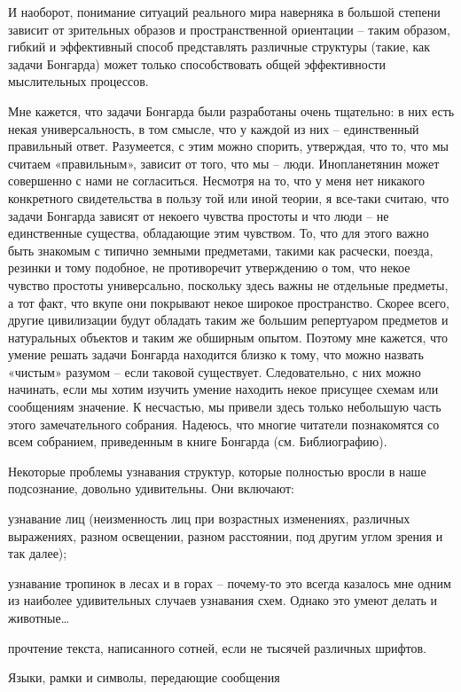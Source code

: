 \documentclass[../main.tex]{subfiles}
\begin{document}
И наоборот, понимание ситуаций реального мира наверняка в большой степени зависит от зрительных образов и пространственной ориентации \--- таким образом, гибкий и эффективный способ представлять различные структуры (такие, как задачи Бонгарда) может только способствовать общей эффективности мыслительных процессов.

Мне кажется, что задачи Бонгарда были разработаны очень тщательно: в них есть некая универсальность, в том смысле, что у каждой из них \--- единственный правильный ответ. Разумеется, с этим можно спорить, утверждая, что то, что мы считаем «правильным», зависит от того, что мы \--- люди. Инопланетянин может совершенно с нами не согласиться. Несмотря на то, что у меня нет никакого конкретного свидетельства в пользу той или иной теории, я все-таки считаю, что задачи Бонгарда зависят от некоего чувства простоты и что люди \--- не единственные существа, обладающие этим чувством. То, что для этого важно быть знакомым с типично земными предметами, такими как расчески, поезда, резинки и тому подобное, не противоречит утверждению о том, что некое чувство простоты универсально, поскольку здесь важны не отдельные предметы, а тот факт, что вкупе они покрывают некое широкое пространство. Скорее всего, другие цивилизации будут обладать таким же большим репертуаром предметов и натуральных объектов и таким же обширным опытом. Поэтому мне кажется, что умение решать задачи Бонгарда находится близко к тому, что можно назвать «чистым» разумом \--- если таковой существует. Следовательно, с них можно начинать, если мы хотим изучить умение находить некое присущее схемам или сообщениям значение. К несчастью, мы привели здесь только небольшую часть этого замечательного собрания. Надеюсь, что многие читатели познакомятся со всем собранием, приведенным в книге Бонгарда (см. Библиографию).

Некоторые проблемы узнавания структур, которые полностью вросли в наше подсознание, довольно удивительны. Они включают:

узнавание лиц (неизменность лиц при возрастных изменениях, различных выражениях, разном освещении, разном расстоянии, под другим углом зрения и так далее);

узнавание тропинок в лесах и в горах \--- почему-то это всегда казалось мне одним из наиболее удивительных случаев узнавания схем. Однако это умеют делать и животные\ldots{}

прочтение текста, написанного сотней, если не тысячей различных шрифтов.

Языки, рамки и символы, передающие сообщения
\end{document}
